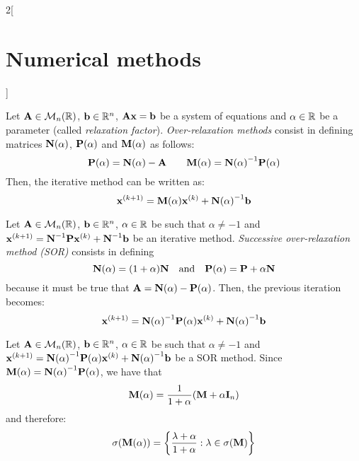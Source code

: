 \documentclass[../../../main.tex]{subfiles}
\begin{document}
\begin{multicols}{2}[\section{Numerical methods}]
\begin{theorem}
    \end{theorem}
    \begin{method}
        Let $\boldsymbol{\mathrm{A}}\in\mathcal{M}_n(\mathbb{R})$, $\boldsymbol{\mathrm{b}}\in\mathbb{R}^n$, $\boldsymbol{\mathrm{A}}\boldsymbol{\mathrm{x}}=\boldsymbol{\mathrm{b}}$ be a system of equations and $\alpha\in\mathbb{R}$ be a parameter (called \textit{relaxation factor}). \textit{Over-relaxation methods} consist in defining matrices $\boldsymbol{\mathrm{N}}(\alpha)$, $\boldsymbol{\mathrm{P}}(\alpha)$ and $\boldsymbol{\mathrm{M}}(\alpha)$ as follows:
        $$\boldsymbol{\mathrm{P}}(\alpha)=\boldsymbol{\mathrm{N}}(\alpha)-\boldsymbol{\mathrm{A}}\qquad\boldsymbol{\mathrm{M}}(\alpha)={\boldsymbol{\mathrm{N}}(\alpha)}^{-1}\boldsymbol{\mathrm{P}}(\alpha)$$
        Then, the iterative method can be written as: $$\boldsymbol{\mathrm{x}}^{(k+1)}=\boldsymbol{\mathrm{M}}(\alpha)\boldsymbol{\mathrm{x}}^{(k)}+{\boldsymbol{\mathrm{N}}(\alpha)}^{-1}\boldsymbol{\mathrm{b}}$$
    \end{method}
    \begin{method}
        Let $\boldsymbol{\mathrm{A}}\in\mathcal{M}_n(\mathbb{R})$, $\boldsymbol{\mathrm{b}}\in\mathbb{R}^n$, $\alpha\in\mathbb{R}$ be such that $\alpha\ne-1$ and $\boldsymbol{\mathrm{x}}^{(k+1)}=\boldsymbol{\mathrm{N}}^{-1}\boldsymbol{\mathrm{P}}\boldsymbol{\mathrm{x}}^{(k)}+\boldsymbol{\mathrm{N}}^{-1}\boldsymbol{\mathrm{b}}$ be an iterative method. \textit{Successive over-relaxation method (SOR)} consists in defining $$\boldsymbol{\mathrm{N}}(\alpha)=(1+\alpha)\boldsymbol{\mathrm{N}}\quad\text{and}\quad\boldsymbol{\mathrm{P}}(\alpha)=\boldsymbol{\mathrm{P}}+\alpha\boldsymbol{\mathrm{N}}$$ because it must be true that $\boldsymbol{\mathrm{A}}=\boldsymbol{\mathrm{N}}(\alpha)-\boldsymbol{\mathrm{P}}(\alpha)$. Then, the previous iteration becomes: $$\boldsymbol{\mathrm{x}}^{(k+1)}={\boldsymbol{\mathrm{N}}(\alpha)}^{-1}\boldsymbol{\mathrm{P}}(\alpha)\boldsymbol{\mathrm{x}}^{(k)}+{\boldsymbol{\mathrm{N}}(\alpha)}^{-1}\boldsymbol{\mathrm{b}}$$
    \end{method}
    \begin{definition}
        Let $\boldsymbol{\mathrm{A}}\in\mathcal{M}_n(\mathbb{R})$, $\boldsymbol{\mathrm{b}}\in\mathbb{R}^n$, $\alpha\in\mathbb{R}$ be such that $\alpha\ne-1$ and $\boldsymbol{\mathrm{x}}^{(k+1)}={\boldsymbol{\mathrm{N}}(\alpha)}^{-1}\boldsymbol{\mathrm{P}}(\alpha)\boldsymbol{\mathrm{x}}^{(k)}+{\boldsymbol{\mathrm{N}}(\alpha)}^{-1}\boldsymbol{\mathrm{b}}$ be a SOR method. Since $\boldsymbol{\mathrm{M}}(\alpha)={\boldsymbol{\mathrm{N}}(\alpha)}^{-1}\boldsymbol{\mathrm{P}}(\alpha)$, we have that $$\boldsymbol{\mathrm{M}}(\alpha)=\frac{1}{1+\alpha}(\boldsymbol{\mathrm{M}}+\alpha\boldsymbol{\mathrm{I}}_n)$$ and therefore: $$\sigma(\boldsymbol{\mathrm{M}}(\alpha))=\left\{\frac{\lambda+\alpha}{1+\alpha}:\lambda\in\sigma(\boldsymbol{\mathrm{M}})\right\}$$

\end{definition}
\end{multicols}
\end{document}
